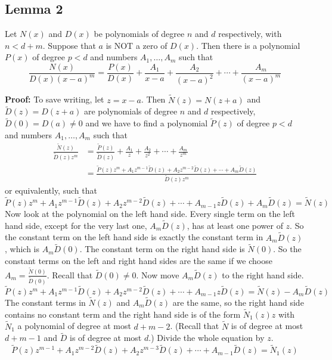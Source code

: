 \subsection{Lemma 2}
Let $N(x)$ and $D(x)$ be polynomials of degree $n$ and $d$ respectively, with $n < d + m$.
Suppose that $a$ is NOT a zero of $D(x)$. Then there is a polynomial $P(x)$ of degree $p < d$ and
numbers $A_1, \dots, A_m$ such that
\[
\frac{N(x)}{D(x) (x-a)^m} = \frac{P(x)}{D(x)} + \frac{A_1}{x-a} + \frac{A_2}{(x-a)^2} + \cdots + \frac{A_m}{(x-a)^m}
\]

\noindent
\textbf{Proof:} To save writing, let $z = x - a$. Then $\tilde{N}(z) = N(z + a)$ and $\tilde{D}(z) = D(z + a)$
are polynomials of degree $n$ and $d$ respectively, $\tilde{D}(0) = D(a) \neq 0$ and we have to find a
polynomial $\tilde{P}(z)$ of degree $p < d$ and numbers $A_1, \dots, A_m$ such that
\begin{align*}
\frac{\tilde{N}(z)}{\tilde{D}(z) z^m} &= \frac{\tilde{P}(z)}{\tilde{D}(z)} + \frac{A_1}{z} + \frac{A_2}{z^2} + \cdots + \frac{A_m}{z^m} \\
&= \frac{\tilde{P}(z) z^m + A_1 z^{m-1} \tilde{D}(z) + A_2 z^{m-2} \tilde{D}(z) + \cdots + A_m \tilde{D}(z)}{\tilde{D}(z) z^m}
\end{align*}
or equivalently, such that
\[
\tilde{P}(z)z^m + A_1 z^{m-1} \tilde{D}(z) + A_2 z^{m-2} \tilde{D}(z) + \cdots + A_{m-1} z \tilde{D}(z) + A_m \tilde{D}(z) = \tilde{N}(z)
\]
Now look at the polynomial on the left hand side. Every single term on the left hand side,
except for the very last one, $A_m \tilde{D}(z)$, has at least one power of $z$. So the constant term on
the left hand side is exactly the constant term in $A_m \tilde{D}(z)$, which is $A_m \tilde{D}(0)$. The constant
term on the right hand side is $\tilde{N}(0)$. So the constant terms on the left and right hand sides
are the same if we choose $A_m = \frac{\tilde{N}(0)}{\tilde{D}(0)}$. Recall that $\tilde{D}(0) \neq 0$. Now move $A_m \tilde{D}(z)$ to the right
hand side.
\[
\tilde{P}(z)z^m + A_1 z^{m-1} \tilde{D}(z) + A_2 z^{m-2} \tilde{D}(z) + \cdots + A_{m-1} z \tilde{D}(z) = \tilde{N}(z) - A_m \tilde{D}(z)
\]
The constant terms in $\tilde{N}(z)$ and $A_m \tilde{D}(z)$ are the same, so the right hand side contains no
constant term and the right hand side is of the form $\tilde{N}_1(z)z$ with $\tilde{N}_1$ a polynomial of degree
at most $d + m - 2$. (Recall that $\tilde{N}$ is of degree at most $d + m - 1$ and $\tilde{D}$ is of degree at most
$d$.) Divide the whole equation by $z$.
\[
\tilde{P}(z)z^{m-1} + A_1 z^{m-2} \tilde{D}(z) + A_2 z^{m-3} \tilde{D}(z) + \cdots + A_{m-1} \tilde{D}(z) = \tilde{N}_1(z)
\]
